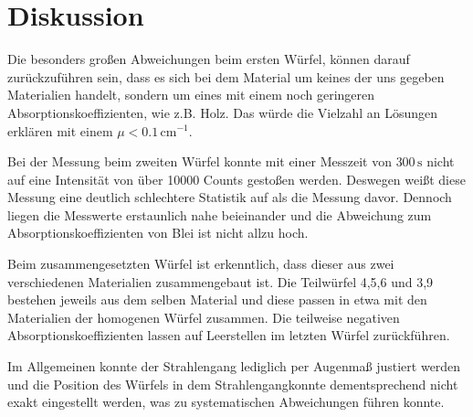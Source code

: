\section{Diskussion}    
    Die besonders großen Abweichungen beim ersten Würfel, können darauf zurückzuführen sein,
    dass es sich bei dem Material um keines der uns gegeben Materialien handelt,
    sondern um eines mit einem noch geringeren Absorptionskoeffizienten, wie z.B. Holz.
    Das würde die Vielzahl an Lösungen erklären mit einem $\mu<0.1\,\text{cm}^{-1}$.

    Bei der Messung beim zweiten Würfel konnte mit einer Messzeit von $300\,\text{s}$ nicht auf eine Intensität von über 10000 Counts gestoßen werden.
    Deswegen weißt diese Messung eine deutlich schlechtere Statistik auf als die Messung davor.
    Dennoch liegen die Messwerte erstaunlich nahe beieinander und die Abweichung zum Absorptionskoeffizienten von Blei ist nicht allzu hoch.

    Beim zusammengesetzten Würfel ist erkenntlich, dass dieser aus zwei verschiedenen Materialien zusammengebaut ist.
    Die Teilwürfel 4,5,6 und 3,9 bestehen jeweils aus dem selben Material und
    diese passen in etwa mit den Materialien der homogenen Würfel zusammen.
    Die teilweise negativen Absorptionskoeffizienten lassen auf Leerstellen im letzten Würfel zurückführen.

    Im Allgemeinen konnte der Strahlengang lediglich per Augenmaß justiert werden und die Position des Würfels in dem
    Strahlengangkonnte dementsprechend nicht exakt eingestellt werden, was zu systematischen Abweichungen führen konnte.
